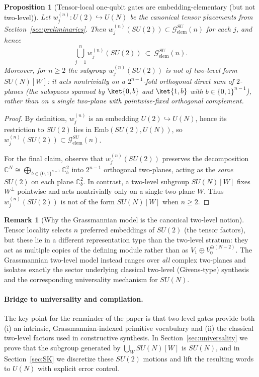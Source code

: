 \documentclass{article}%
\newtheorem{proposition}[theorem]{Proposition}
\theoremstyle{definition}
\newtheorem{remark}[theorem]{Remark}
\numberwithin{equation}{section}
\newcommand{\C}{\mathbb{C}}
\newcommand{\Emb}{\mathrm{Emb}}
\begin{document}
\begin{proposition}[Tensor-local one-qubit gates are embedding-elementary (but not two-level)]
\label{prop:local_in_Gelem_not_2lvl}
Let $w_j^{(n)}:U(2)\hookrightarrow U(N)$ be the canonical tensor placements from
Section~\ref{sec:preliminaries}. Then $w_j^{(n)}(SU(2))\subset \mathcal{G}_{\mathrm{elem}}^{SU}(n)$
for each $j$, and hence
\[
\bigcup_{j=1}^n w_j^{(n)}(SU(2))\ \subset\ \mathcal{G}_{\mathrm{elem}}^{SU}(n).
\]
Moreover, for $n\ge 2$ the subgroup $w_j^{(n)}(SU(2))$ is not of two-level form $SU(N)[W]$: it acts
nontrivially on a $2^{n-1}$-fold orthogonal direct sum of $2$-planes (the subspaces spanned by
$\ket{0,b}$ and $\ket{1,b}$ with $b\in\{0,1\}^{n-1}$), rather than on a single two-plane with
pointwise-fixed orthogonal complement.
\end{proposition}

\begin{proof}
By definition, $w_j^{(n)}$ is an embedding $U(2)\hookrightarrow U(N)$, hence its restriction to
$SU(2)$ lies in $\Emb(SU(2),U(N))$, so $w_j^{(n)}(SU(2))\subset \mathcal{G}_{\mathrm{elem}}^{SU}(n)$.

For the final claim, observe that $w_j^{(n)}(SU(2))$ preserves the decomposition
$\C^N\cong\bigoplus_{b\in\{0,1\}^{n-1}} \C^2_{b}$ into $2^{n-1}$ orthogonal two-planes, acting as the
\emph{same} $SU(2)$ on each plane $\C^2_b$. In contrast, a two-level subgroup $SU(N)[W]$ fixes
$W^\perp$ pointwise and acts nontrivially only on a single two-plane $W$. Thus $w_j^{(n)}(SU(2))$ is
not of the form $SU(N)[W]$ when $n\ge 2$.
\end{proof}

\begin{remark}[Why the Grassmannian model is the canonical two-level notion]
Tensor locality selects $n$ preferred embeddings of $SU(2)$ (the tensor factors), but these lie in a
different representation type than the two-level stratum: they act as multiple copies of the defining
module rather than as $V_1\oplus V_0^{\oplus(N-2)}$. The Grassmannian two-level model instead ranges
over \emph{all} complex two-planes and isolates exactly the sector underlying classical two-level
(Givens-type) synthesis and the corresponding universality mechanism for $SU(N)$.
\end{remark}

\paragraph{Bridge to universality and compilation.}
The key point for the remainder of the paper is that two-level gates provide both (i) an intrinsic,
Grassmannian-indexed primitive vocabulary and (ii) the classical two-level factors used in
constructive synthesis. In Section~\ref{sec:universality} we prove that the subgroup generated by
$\bigcup_{W}SU(N)[W]$ is $SU(N)$, and in Section~\ref{sec:SK} we discretize these $SU(2)$ motions and
lift the resulting words to $U(N)$ with explicit error control.
\end{document}
